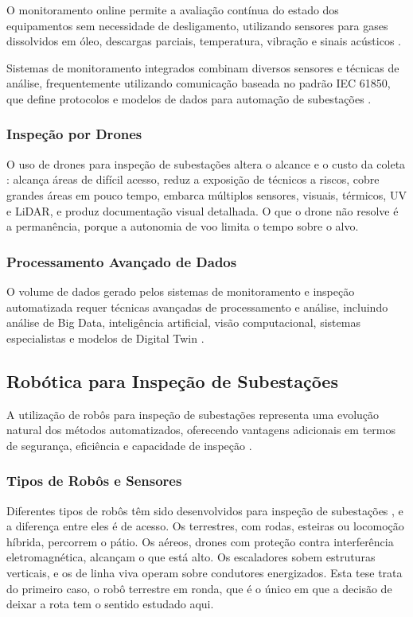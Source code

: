 O monitoramento online permite a avaliação contínua do estado dos equipamentos sem necessidade de desligamento, utilizando sensores para gases dissolvidos em óleo, descargas parciais, temperatura, vibração e sinais acústicos \cite{Clouglobal2024}.

Sistemas de monitoramento integrados combinam diversos sensores e técnicas de análise, frequentemente utilizando comunicação baseada no padrão IEC 61850, que define protocolos e modelos de dados para automação de subestações \cite{Selinc2024}.

\subsubsection{Inspeção por Drones}

O uso de drones para inspeção de subestações altera o alcance e o custo da coleta
\cite{Pixforce2023}: alcança áreas de difícil acesso, reduz a exposição de técnicos a
riscos, cobre grandes áreas em pouco tempo, embarca múltiplos sensores, visuais,
térmicos, UV e LiDAR, e produz documentação visual detalhada. O que o drone não resolve é
a permanência, porque a autonomia de voo limita o tempo sobre o alvo.

\subsubsection{Processamento Avançado de Dados}

O volume de dados gerado pelos sistemas de monitoramento e inspeção automatizada requer técnicas avançadas de processamento e análise, incluindo análise de Big Data, inteligência artificial, visão computacional, sistemas especialistas e modelos de Digital Twin \cite{Clouglobal2024}.

\subsection{Robótica para Inspeção de Subestações}

A utilização de robôs para inspeção de subestações representa uma evolução natural dos métodos automatizados, oferecendo vantagens adicionais em termos de segurança, eficiência e capacidade de inspeção \cite{Lactec2022}.

\subsubsection{Tipos de Robôs e Sensores}

Diferentes tipos de robôs têm sido desenvolvidos para inspeção de subestações
\cite{GlobalGrowthInsights2024}, e a diferença entre eles é de acesso. Os terrestres, com
rodas, esteiras ou locomoção híbrida, percorrem o pátio. Os aéreos, drones com proteção
contra interferência eletromagnética, alcançam o que está alto. Os escaladores sobem
estruturas verticais, e os de linha viva operam sobre condutores energizados. Esta tese
trata do primeiro caso, o robô terrestre em ronda, que é o único em que a decisão de
deixar a rota tem o sentido estudado aqui.

